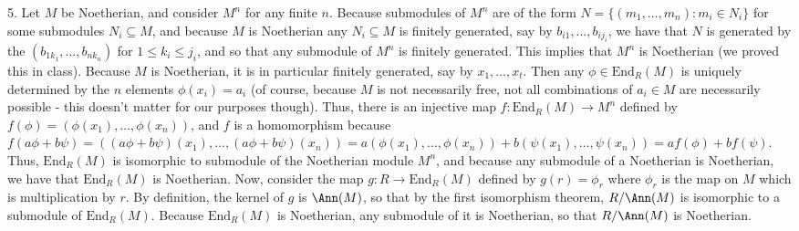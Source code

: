 \documentclass[11pt]{article}
\begin{document}
\num{5.} Let $M$ be Noetherian, and consider $M^n$ for any finite $n$. Because
submodules of $M^n$ are of the form $N=\{(m_1,\ldots,m_n):m_i\in N_i\}$
for some submodules $N_i\subseteq M$, and because $M$ is Noetherian any
$N_i\subseteq M$ is finitely generated, say by $b_{i1},\ldots,b_{ij_i}$,
we have that $N$ is generated by the $(b_{1k_1},\ldots,b_{nk_n})$ for
$1\leq k_i\leq j_i$, and so that any submodule of $M^n$ is finitely
generated. This implies that $M^n$ is Noetherian (we proved this
in class). Because $M$ is Noetherian, it is in particular finitely
generated, say by $x_1,\ldots,x_t$. Then any $\phi\in\text{End}_R(M)$
is uniquely determined by the $n$ elements $\phi(x_i)=a_i$ (of course,
because $M$ is not necessarily free, not all combinations of $a_i\in M$ are
necessarily possible - this doesn't matter for our purposes though). Thus,
there is an injective map $f:\text{End}_R(M)\rightarrow M^n$ defined
by $f(\phi)=(\phi(x_1),\ldots,\phi(x_n))$, and $f$ is a homomorphism because
$f(a\phi+b\psi)=((a\phi+b\psi)(x_1),\ldots,(a\phi+b\psi)(x_n))=a(\phi(x_1),\ldots,\phi(x_n))+b(\psi(x_1),\ldots,\psi(x_n))=af(\phi)+bf(\psi)$.
Thus, $\text{End}_R(M)$ is isomorphic to submodule of the Noetherian
module $M^n$, and because any submodule of a Noetherian is Noetherian,
we have that $\text{End}_R(M)$ is Noetherian. Now, consider the map
$g:R\rightarrow\text{End}_R(M)$ defined by $g(r)=\phi_r$ where $\phi_r$ is the
map on $M$ which is multiplication by $r$. By definition, the kernel of $g$ is
$\Ann(M)$, so that by the first isomorphism theorem, $R/\Ann(M)$ is isomorphic
to a submodule of $\text{End}_R(M)$. Because $\text{End}_R(M)$ is Noetherian,
any submodule of it is Noetherian, so that $R/\Ann(M)$ is Noetherian.     \\
\end{document}
